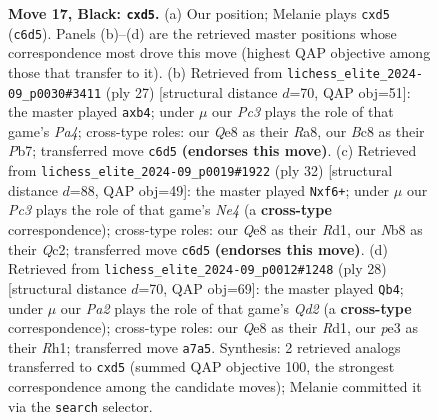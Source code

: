 \documentclass[11pt]{article}
\begin{document}
\begin{figure}[p]
\caption{\textbf{Move 17, Black: \texttt{cxd5}.} (a) Our position; Melanie plays \texttt{cxd5} (\texttt{c6d5}). Panels (b)--(d) are the retrieved master positions whose correspondence most drove this move (highest QAP objective among those that transfer to it). (b) Retrieved from \texttt{lichess\_elite\_2024-09\_p0030\#3411} (ply 27) [structural distance $d$=70, QAP obj=51]: the master played \texttt{axb4}; under $\mu$ our \emph{Pc3} plays the role of that game's \emph{Pa4}; cross-type roles: our \emph{Q}e8 as their \emph{R}a8, our \emph{B}c8 as their \emph{P}b7; transferred move \texttt{c6d5} \textbf{(endorses this move)}. (c) Retrieved from \texttt{lichess\_elite\_2024-09\_p0019\#1922} (ply 32) [structural distance $d$=88, QAP obj=49]: the master played \texttt{Nxf6+}; under $\mu$ our \emph{Pc3} plays the role of that game's \emph{Ne4} (a \textbf{cross-type} correspondence); cross-type roles: our \emph{Q}e8 as their \emph{R}d1, our \emph{N}b8 as their \emph{Q}c2; transferred move \texttt{c6d5} \textbf{(endorses this move)}. (d) Retrieved from \texttt{lichess\_elite\_2024-09\_p0012\#1248} (ply 28) [structural distance $d$=70, QAP obj=69]: the master played \texttt{Qb4}; under $\mu$ our \emph{Pa2} plays the role of that game's \emph{Qd2} (a \textbf{cross-type} correspondence); cross-type roles: our \emph{Q}e8 as their \emph{R}d1, our \emph{p}e3 as their \emph{R}h1; transferred move \texttt{a7a5}. Synthesis: 2 retrieved analogs transferred to \texttt{cxd5} (summed QAP objective 100, the strongest correspondence among the candidate moves); Melanie committed it via the \texttt{search} selector.}
\label{fig:thought-m33}
\end{figure}

\clearpage
\end{document}
